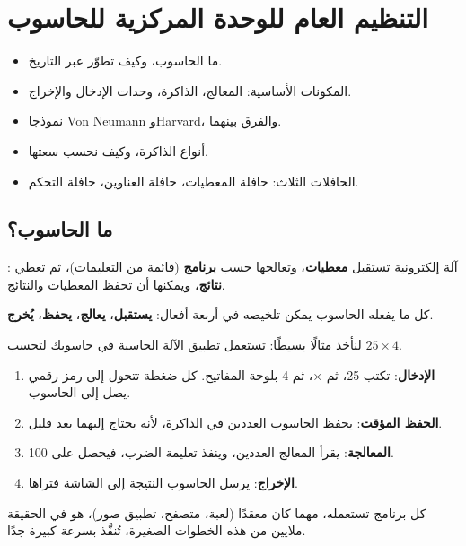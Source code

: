 \chapter{التنظيم العام للوحدة المركزية للحاسوب}

\begin{khulasa}
\begin{itemize}
    \item ما الحاسوب، وكيف تطوّر عبر التاريخ.
    \item المكونات الأساسية: المعالج، الذاكرة، وحدات الإدخال والإخراج.
    \item نموذجا \textenglish{Von Neumann} و\textenglish{Harvard}، والفرق بينهما.
    \item أنواع الذاكرة، وكيف نحسب سعتها.
    \item الحافلات الثلاث: حافلة المعطيات، حافلة العناوين، حافلة التحكم.
\end{itemize}
\end{khulasa}

\section{ما الحاسوب؟}

\begin{tarif}
    : آلة إلكترونية تستقبل \textbf{معطيات}،
    وتعالجها حسب \textbf{برنامج} (قائمة من التعليمات)، ثم تعطي \textbf{نتائج}، ويمكنها أن تحفظ
    المعطيات والنتائج.
\end{tarif}

كل ما يفعله الحاسوب يمكن تلخيصه في أربعة أفعال: \textbf{يستقبل}، \textbf{يعالج}،
\textbf{يحفظ}، \textbf{يُخرج}.

لنأخذ مثالًا بسيطًا: تستعمل تطبيق الآلة الحاسبة في حاسوبك لتحسب $25 \times 4$.
\begin{enumerate}
    \item \textbf{الإدخال}: تكتب \textenglish{25}، ثم \textenglish{×}، ثم \textenglish{4} بلوحة المفاتيح.
          كل ضغطة تتحول إلى رمز رقمي يصل إلى الحاسوب.
    \item \textbf{الحفظ المؤقت}: يحفظ الحاسوب العددين في الذاكرة، لأنه يحتاج إليهما بعد قليل.
    \item \textbf{المعالجة}: يقرأ المعالج العددين، وينفذ تعليمة الضرب، فيحصل على \textenglish{100}.
    \item \textbf{الإخراج}: يرسل الحاسوب النتيجة إلى الشاشة فتراها.
\end{enumerate}
كل برنامج تستعمله، مهما كان معقدًا (لعبة، متصفح، تطبيق صور)، هو في الحقيقة ملايين من هذه
الخطوات الصغيرة، تُنفَّذ بسرعة كبيرة جدًا.

